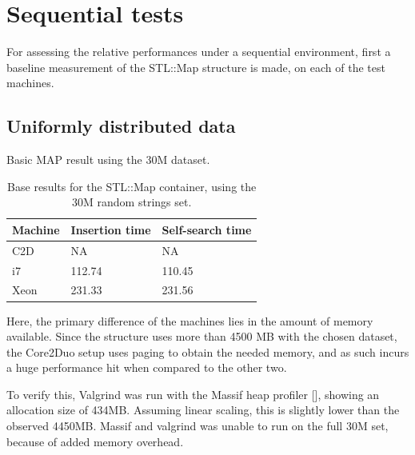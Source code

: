\section{Sequential tests}
For assessing the relative performances under a sequential environment, first a
baseline measurement of the {\keyword STL::Map} structure is made, on each of
the test machines.

\subsection{Uniformly distributed data}
Basic MAP result using the 30M dataset.

\begin{table}[h!]
    \centering
    \begin{tabular}[here]{ l l l }
        \hline
        Machine   & Insertion time & Self-search time  \\\hline
        C2D       & NA             & NA                \\\hline
        i7        & 112.74         & 110.45            \\\hline
        Xeon      & 231.33         & 231.56            \\\hline 
    \end{tabular}
    \caption{Base results for the STL::Map container, using the 30M random strings set.}
    \label{tab:maptimes}
\end{table}

Here, the primary difference of the machines lies in the amount of memory
available. Since the structure uses more than 4500 MB with the chosen dataset,
the Core2Duo setup uses paging to obtain the needed memory, and as such incurs
a huge performance hit when compared to the other two.

To verify this, Valgrind was run with the Massif heap profiler
[\pageref{fig:Massif_map_30m}], showing an allocation size of 434MB. Assuming
linear scaling, this is slightly lower than the observed 4450MB. Massif and
valgrind was unable to run on the full 30M set, because of added memory
overhead.


